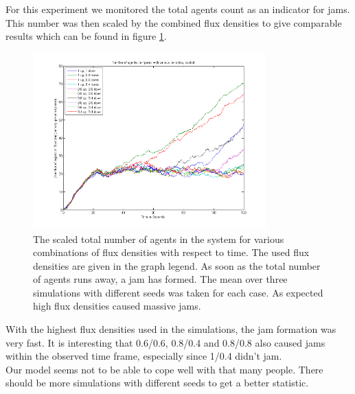 
\noi For this experiment we monitored the total agents count as an indicator for jams. This number was then scaled by the combined flux densities to give comparable results which can be found in figure \ref{fig:AAllAveragesScaled}.\\
\begin{figure}[h!]
	\centering
		\includegraphics[width=0.80\textwidth]{pictures/AAllAveragesScaled.png}
	\caption{The scaled total number of agents in the system for various combinations of flux densities with respect to time. The used flux densities are given in the graph legend. As soon as the total number of agents runs away, a jam has formed. The mean over three simulations with different seeds was taken for each case. As expected high flux densities caused massive jams.}
	\label{fig:AAllAveragesScaled}
\end{figure}

\noi With the highest flux densities used in the simulations, the jam formation was very fast. It is interesting that 0.6/0.6, 0.8/0.4 and 0.8/0.8 also caused jams within the observed time frame, especially since 1/0.4 didn't jam.\\
Our model seems not to be able to cope well with that many people. There should be more simulations with different seeds to get a better statistic.\\

